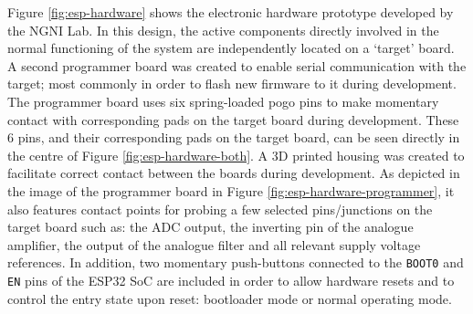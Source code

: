 Figure \ref{fig:esp-hardware} shows the electronic hardware prototype developed by the NGNI Lab. In this design, the active components directly involved in the normal functioning of the system are independently located on a `target' board. A second programmer board was created to enable serial communication with the target; most commonly in order to flash new firmware to it during development. The programmer board uses six spring-loaded pogo pins to make momentary contact with corresponding pads on the target board during development. These 6 pins, and their corresponding pads on the target board, can be seen directly in the centre of Figure \ref{fig:esp-hardware-both}. A 3D printed housing was created to facilitate correct contact between the boards during development. As depicted in the image of the programmer board in Figure \ref{fig:esp-hardware-programmer}, it also features contact points for probing a few selected pins/junctions on the target board such as: the ADC output, the inverting pin of the analogue amplifier, the output of the analogue filter and all relevant supply voltage references. In addition, two momentary push-buttons connected to the \texttt{BOOT0} and \texttt{EN} pins of the ESP32 SoC are included in order to allow hardware resets and to control the entry state upon reset: bootloader mode or normal operating mode. 

